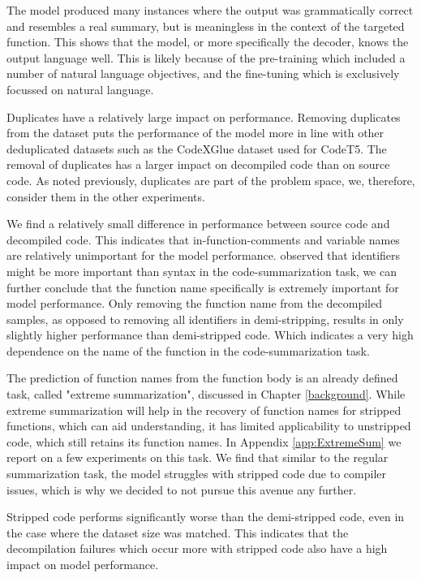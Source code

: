 The model produced many instances where the output was grammatically correct and resembles a real summary, but is meaningless in the context of the targeted function. This shows that the model, or more specifically the decoder, knows the output language well. This is likely because of the pre-training which included a number of natural language objectives, and the fine-tuning which is exclusively focussed on natural language.

Duplicates have a relatively large impact on performance. Removing duplicates from the dataset puts the performance of the model more in line with other deduplicated datasets such as the CodeXGlue dataset used for CodeT5. The removal of duplicates has a larger impact on decompiled code than on source code. As noted previously, duplicates are part of the problem space, we, therefore, consider them in the other experiments.

We find a relatively small difference in performance between source code and decompiled code. This indicates that in-function-comments and variable names are relatively unimportant for the model performance. \citeauthor{PolyglotCodeBERT} observed that identifiers might be more important than syntax in the code-summarization task, we can further conclude that the function name specifically is extremely important for model performance. Only removing the function name from the decompiled samples, as opposed to removing all identifiers in demi-stripping, results in only slightly higher performance than demi-stripped code. Which indicates a very high dependence on the name of the function in the code-summarization task. 

The prediction of function names from the function body is an already defined task, called "extreme summarization", discussed in Chapter \ref{background}. While extreme summarization will help in the recovery of function names for stripped functions, which can aid understanding, it has limited applicability to unstripped code, which still retains its function names. In Appendix \ref{app:ExtremeSum} we report on a few experiments on this task. We find that similar to the regular summarization task, the model struggles with stripped code due to compiler issues, which is why we decided to not pursue this avenue any further. 

Stripped code performs significantly worse than the demi-stripped code, even in the case where the dataset size was matched. This indicates that the decompilation failures which occur more with stripped code also have a high impact on model performance.

